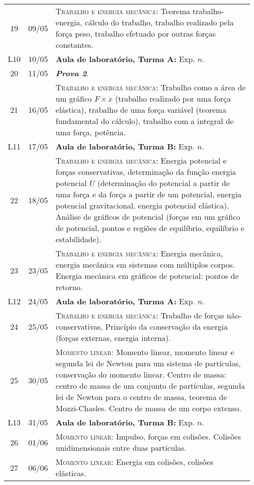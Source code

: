 \begin{center}
\begin{longtable}{ccp{70mm}}
19	 & 	09/05	 & 	\textsc{Trabalho e energia mecânica:} Teorema trabalho-energia, cálculo do trabalho, trabalho realizado pela força peso, trabalho efetuado por outras forças constantes.\\
L10  &  10/05    &  \textbf{Aula de laboratório, Turma A:} Exp. $n$. \\
20	 & 	11/05	 & 	\textbf{\textit{Prova 2}}. \\
21	 & 	16/05	 & 	\textsc{Trabalho e energia mecânica:} Trabalho como a área de um gráfico $F \times x$ (trabalho realizado por uma força elástica), trabalho de uma força variável (teorema fundamental do cálculo), trabalho com a integral de uma força, potência. \\
L11  &  17/05    &  \textbf{Aula de laboratório, Turma B:} Exp. $n$. \\
22	 & 	18/05	 & 	\textsc{Trabalho e energia mecânica:} Energia potencial e forças conservativas, determinação da função energia potencial $U$ (determinação do potencial a partir de uma força e da força a partir de um potencial, energia potencial gravitacional, energia potencial elástica). Análise de gráficos de potencial (forças em um gráfico de potencial, pontos e regiões de equilíbrio, equilíbrio e estabilidade).\\
23	 & 	23/05	 & 	\textsc{Trabalho e energia mecânica:} Energia mecânica, energia mecânica em sistemas com múltiplos corpos. Energia mecânica em gráficos de potencial: pontos de retorno. \\
L12  &  24/05    &  \textbf{Aula de laboratório, Turma A:} Exp. $n$. \\
24	 & 	25/05	 & 	\textsc{Trabalho e energia mecânica:} Trabalho de forças não-conservativas, Princípio da conservação da energia (forças externas, energia interna). \\
25	 & 	30/05	 & 	\textsc{Momento linear:} Momento linear, momento linear e segunda lei de Newton para um sistema de partículas, conservação do momento linear. Centro de massa: centro de massa de um conjunto de partículas, segunda lei de Newton para o centro de massa, teorema de Mozzi-Chasles. Centro de massa de um corpo extenso.\\
L13  &  31/05    &  \textbf{Aula de laboratório, Turma B:} Exp. $n$.\\
26	 & 	01/06	 & 	\textsc{Momento linear:} Impulso, forças em colisões. Colisões unidimensionais entre duas partículas. \\
27	 & 	06/06	 & 	\textsc{Momento linear:} Energia em colisões, colisões elásticas. \\

\end{longtable}
\end{center}
